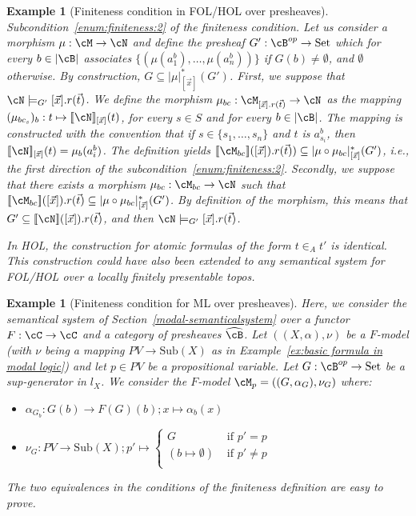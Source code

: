 \documentclass[preprint,3p,times]{elsarticle}
\newtheorem{example}[definition]{Example}
\newcommand{\Set}{\mathrm{Set}}
\newcommand{\Sub}{\mathrm{Sub}}
\def\sem#1{[\![ #1 ] \!]}
\begin{document}
\begin{example}[Finiteness condition in FOL/HOL over presheaves]
\emph{Subcondition~\ref{enum:finiteness:2} of the finiteness condition.}
Let us consider a morphism $\mu : \cM \to \cN$ and define the presheaf $G' : \cB^{op} \to \Set$ which for every $b \in |\cB|$ associates $\{(\mu(a^b_1),\ldots,\mu(a^b_n))\}$ if $G(b) \neq \emptyset$, and $\emptyset$ otherwise. By construction, $G \subseteq |\mu|^*_{[\vec{x}]}(G')$. First, we suppose that $\cN \models_{G'} [\vec{x}].r(\vec{t})$. We define the morphism $\mu_{bc} : \cM_{[\vec{x}].r(\vec{t})} \to \cN$ as the mapping $(\mu_{bc_s})_b : t \mapsto \sem{\cN}_{[\vec{x}]}(t)$, for every $s \in S$ and for every $b \in |\cB|$. The mapping is constructed with the convention that if $s \in \{s_1,\ldots,s_n\}$ and $t$ is $a^b_{s_i}$, then $\sem{\cN}_{[\vec{x}]}(t) = \mu_b(a^b_i)$. The definition yields $\sem{\cM_{bc}}([\vec{x}]).r(\vec{t})) \subseteq |\mu \circ \mu_{bc}|^*_{[\vec{x}]}(G')$, i.e., the first direction of the subcondition~\ref{enum:finiteness:2}. Secondly, we suppose that there exists a morphism $\mu_{bc} : \cM_{bc} \to \cN$ such that $\sem{\cM_{bc}}([\vec{x}]).r(\vec{t}) \subseteq |\mu \circ \mu_{bc}|^*_{[\vec{x}]}(G')$. By definition of the morphism, this means that $G' \subseteq \sem{\cN}([\vec{x}]).r(\vec{t})$, and then $\cN \models_{G'} [\vec{x}].r(\vec{t})$.

\medskip
In HOL, the construction for atomic formulas of the form $t \in_A t'$ is identical. This construction could have also been extended to any semantical system for FOL/HOL over a locally finitely presentable topos. 
\end{example}

\begin{example}[Finiteness condition for ML over presheaves]
Here, we consider the semantical system of Section~\ref{modal-semanticalsystem} over a functor $F : \cC \to \cC$ and a category of presheaves $\widehat{\cB}$. Let $((X,\alpha),\nu)$ be a $F$-model (with $\nu$ being a mapping $PV \to \Sub(X)$ as in Example~\ref{ex:basic formula in modal logic}) and let $p \in PV$ be a propositional variable. Let $G : \cB^{op} \to \Set$ be a sup-generator in $l_X$. We consider the $F$-model $\cM_p = ((G,\alpha_G),\nu_G)$ where:
\begin{itemize}
    \item $\alpha_{G_b} : G(b) \to F(G)(b);x \mapsto \alpha_b(x)$
    \item $\nu_G : PV \to \Sub(X) ; p' \mapsto
    \left\{\begin{array}{ll}
        G                       & \text{ if } p' = p\\
        (b \mapsto \emptyset)   & \text{ if } p' \neq p\\
    \end{array}\right.
    $
\end{itemize}
The two equivalences in the conditions of the finiteness definition are easy to prove. 
\end{example}
\end{document}
